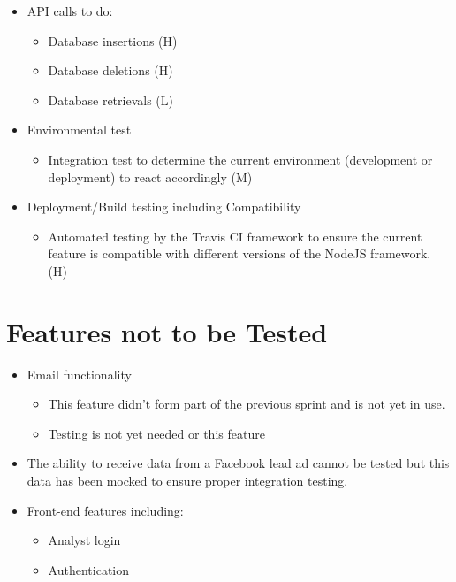 \documentclass{article}
\begin{document}
\begin{itemize}
\item API calls to do:
	\begin{itemize}
	\item Database insertions (H)
	\item Database deletions (H)
	\item Database retrievals (L)
	\end{itemize}
\item Environmental test
	\begin{itemize}
	\item Integration test to determine the current environment (development or deployment) to react accordingly (M)
	\end{itemize}
\item Deployment/Build testing including Compatibility
		\begin{itemize}
	\item Automated testing by the Travis CI framework to ensure the current feature is compatible with different versions of the NodeJS framework. (H)
	\end{itemize}
\end{itemize}

\cleardoublepage
\section{Features not to be Tested}
\begin{itemize}
	\item Email functionality
	\begin{itemize}
		\item This feature didn't form part of the previous sprint and is not yet in use.
		\item Testing is not yet needed or this feature
	\end{itemize}
	\item The ability to receive data from a Facebook lead ad cannot be tested but this data has been mocked to ensure proper integration testing.
	\item Front-end features including:
	\begin{itemize}
		\item Analyst login
		\item Authentication
	\end{itemize}
\end{itemize}
\end{document}
